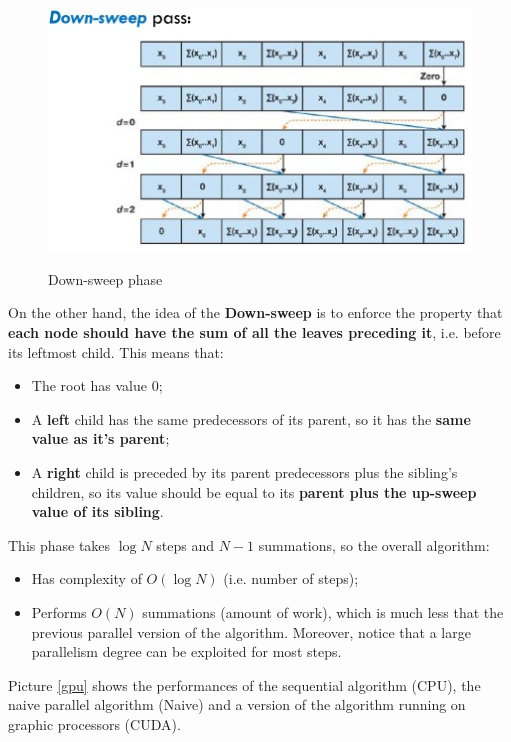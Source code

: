 \begin{figure}[h!]
		\centering
		\includegraphics[scale = 2.0]{img/down-sweep2.jpg}
        \label{down-sweep}
        \caption{Down-sweep phase}
\end{figure}

On the other hand, the idea of the \textbf{Down-sweep} is to enforce the property that \textbf{each node should have the sum of all the leaves preceding it}, i.e. before its leftmost child. This means that:

\begin{itemize}
    \item The root has value 0;
    \item A \textbf{left} child has the same predecessors of its parent, so it has the \textbf{same value as it's parent};
    \item A \textbf{right} child is preceded by its parent predecessors plus the sibling's children, so its value should be equal to its \textbf{parent plus the up-sweep value of its sibling}.
\end{itemize}

This phase takes $\log N$ steps and $N-1$ summations, so the overall algorithm:

\begin{itemize}
    \item Has  complexity of $O(\log N)$ (i.e. number of steps);
    \item Performs $O(N)$ summations (amount of work), which is much less that the previous parallel version of the algorithm. Moreover, notice that a large parallelism degree can be exploited for most steps.
\end{itemize}

Picture \ref{gpu} shows the performances of the sequential algorithm (CPU), the naive parallel algorithm (Naive) and a version of the algorithm running on graphic processors (CUDA).

